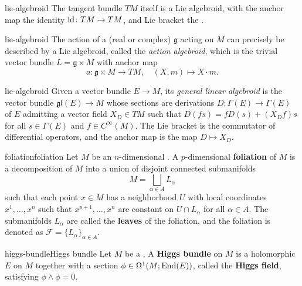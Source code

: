 \begin{example}{lie-algebroid}
    The tangent bundle $TM$ itself is a Lie algebroid, with the anchor map the identity $\textup{id} \colon TM \to TM$, and Lie bracket the .
\end{example}

\begin{example}{lie-algebroid}
    The action of a (real or complex)  $\mathfrak{g}$ acting on $M$ can precisely be described by a Lie algebroid, called the \textit{action algebroid}, which is the trivial vector bundle $L = \mathfrak{g} \times M$ with anchor map
    \[ a \colon \mathfrak{g} \times M \to TM, \quad (X, m) \mapsto X \cdot m . \]
\end{example}

\begin{example}{lie-algebroid}
    Given a vector bundle $E \to M$, its \textit{general linear algebroid} is the vector bundle $\mathfrak{gl}(E) \to M$ whose sections are derivations $D \colon \Gamma(E) \to \Gamma(E)$ of $E$ admitting a vector field $X_D \in TM$ such that $D(f s) = f D(s) + (X_D f) s$ for all $s \in \Gamma(E)$ and $f \in C^\infty(M)$. The Lie bracket is the commutator of differential operators, and the anchor map is the map $D \mapsto X_D$.
\end{example}

\begin{topic}{foliation}{foliation}
    Let $M$ be an $n$-dimensional . A $p$-dimensional \textbf{foliation} of $M$ is a decomposition of $M$ into a union of disjoint connected submanifolds
    \[ M = \bigsqcup_{\alpha \in A} L_\alpha \]
    such that each point $x \in M$ has a neighborhood $U$ with local coordinates $x^1, \ldots, x^n$ such that $x^{p + 1}, \ldots, x^n$ are constant on $U \cap L_\alpha$ for all $\alpha \in A$. The submanifolds $L_\alpha$ are called the \textbf{leaves} of the foliation, and the foliation is denoted as $\mathcal{F} = \{ L_\alpha \}_{\alpha \in A}$.
\end{topic}

\begin{topic}{higgs-bundle}{Higgs bundle}
    Let $M$ be a . A \textbf{Higgs bundle} on $M$ is a holomorphic  $E$ on $M$ together with a section $\phi \in \Omega^1(M; \textup{End}(E))$, called the \textbf{Higgs field}, satisfying $\phi \wedge \phi = 0$.
\end{topic}

